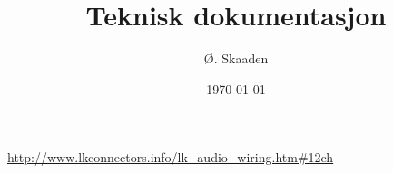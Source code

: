 \documentclass[11pt,english]{teknisk-notat}
\title{Teknisk dokumentasjon}
\author{Ø. Skaaden}
\date{\today}
\begin{document}
\maketitle

\toc

\url{http://www.lkconnectors.info/lk_audio_wiring.htm#12ch}


{}

\printbibliography

\appendix
%
\end{document}

